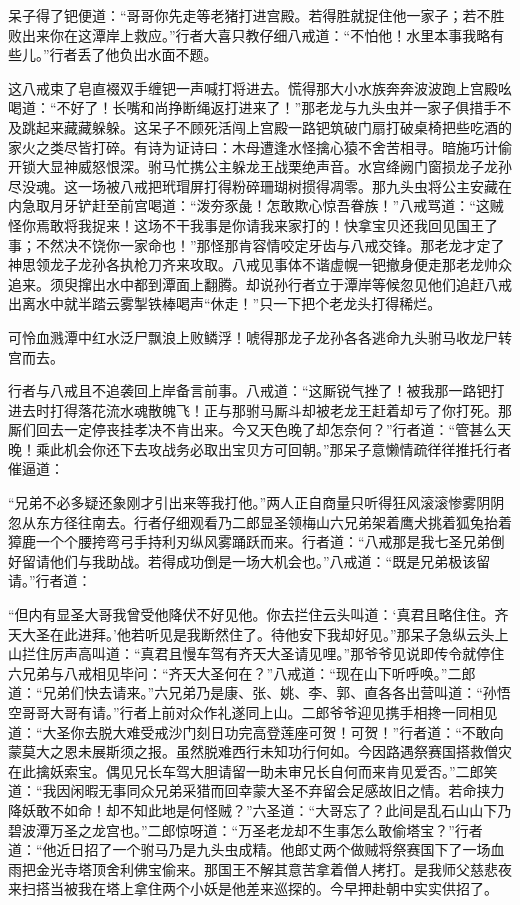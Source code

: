 \documentclass[12pt,UTF8]{ctexbook}
\begin{document}
呆子得了钯便道：“哥哥你先走等老猪打进宫殿。若得胜就捉住他一家子；若不胜败出来你在这潭岸上救应。”行者大喜只教仔细八戒道：“不怕他！水里本事我略有些儿。”行者丢了他负出水面不题。

这八戒束了皂直裰双手缠钯一声喊打将进去。慌得那大小水族奔奔波波跑上宫殿吆喝道：“不好了！长嘴和尚挣断绳返打进来了！”那老龙与九头虫并一家子俱措手不及跳起来藏藏躲躲。这呆子不顾死活闯上宫殿一路钯筑破门扇打破桌椅把些吃酒的家火之类尽皆打碎。有诗为证诗曰：木母遭逢水怪擒心猿不舍苦相寻。暗施巧计偷开锁大显神威怒恨深。驸马忙携公主躲龙王战栗绝声音。水宫绛阙门窗损龙子龙孙尽没魂。这一场被八戒把玳瑁屏打得粉碎珊瑚树掼得凋零。那九头虫将公主安藏在内急取月牙铲赶至前宫喝道：“泼夯豕彘！怎敢欺心惊吾眷族！”八戒骂道：“这贼怪你焉敢将我捉来！这场不干我事是你请我来家打的！快拿宝贝还我回见国王了事；不然决不饶你一家命也！”那怪那肯容情咬定牙齿与八戒交锋。那老龙才定了神思领龙子龙孙各执枪刀齐来攻取。八戒见事体不谐虚幌一钯撤身便走那老龙帅众追来。须臾撺出水中都到潭面上翻腾。却说孙行者立于潭岸等候忽见他们追赶八戒出离水中就半踏云雾掣铁棒喝声“休走！”只一下把个老龙头打得稀烂。

可怜血溅潭中红水泛尸飘浪上败鳞浮！唬得那龙子龙孙各各逃命九头驸马收龙尸转宫而去。

行者与八戒且不追袭回上岸备言前事。八戒道：“这厮锐气挫了！被我那一路钯打进去时打得落花流水魂散魄飞！正与那驸马厮斗却被老龙王赶着却亏了你打死。那厮们回去一定停丧挂孝决不肯出来。今又天色晚了却怎奈何？”行者道：“管甚么天晚！乘此机会你还下去攻战务必取出宝贝方可回朝。”那呆子意懒情疏徉徉推托行者催逼道：

“兄弟不必多疑还象刚才引出来等我打他。”两人正自商量只听得狂风滚滚惨雾阴阴忽从东方径往南去。行者仔细观看乃二郎显圣领梅山六兄弟架着鹰犬挑着狐兔抬着獐鹿一个个腰挎弯弓手持利刃纵风雾踊跃而来。行者道：“八戒那是我七圣兄弟倒好留请他们与我助战。若得成功倒是一场大机会也。”八戒道：“既是兄弟极该留请。”行者道：

“但内有显圣大哥我曾受他降伏不好见他。你去拦住云头叫道：‘真君且略住住。齐天大圣在此进拜。’他若听见是我断然住了。待他安下我却好见。”那呆子急纵云头上山拦住厉声高叫道：“真君且慢车驾有齐天大圣请见哩。”那爷爷见说即传令就停住六兄弟与八戒相见毕问：“齐天大圣何在？”八戒道：“现在山下听呼唤。”二郎道：“兄弟们快去请来。”六兄弟乃是康、张、姚、李、郭、直各各出营叫道：“孙悟空哥哥大哥有请。”行者上前对众作礼遂同上山。二郎爷爷迎见携手相搀一同相见道：“大圣你去脱大难受戒沙门刻日功完高登莲座可贺！可贺！”行者道：“不敢向蒙莫大之恩未展斯须之报。虽然脱难西行未知功行何如。今因路遇祭赛国搭救僧灾在此擒妖索宝。偶见兄长车驾大胆请留一助未审兄长自何而来肯见爱否。”二郎笑道：“我因闲暇无事同众兄弟采猎而回幸蒙大圣不弃留会足感故旧之情。若命挟力降妖敢不如命！却不知此地是何怪贼？”六圣道：“大哥忘了？此间是乱石山山下乃碧波潭万圣之龙宫也。”二郎惊呀道：“万圣老龙却不生事怎么敢偷塔宝？”行者道：“他近日招了一个驸马乃是九头虫成精。他郎丈两个做贼将祭赛国下了一场血雨把金光寺塔顶舍利佛宝偷来。那国王不解其意苦拿着僧人拷打。是我师父慈悲夜来扫搭当被我在塔上拿住两个小妖是他差来巡探的。今早押赴朝中实实供招了。
\end{document}

